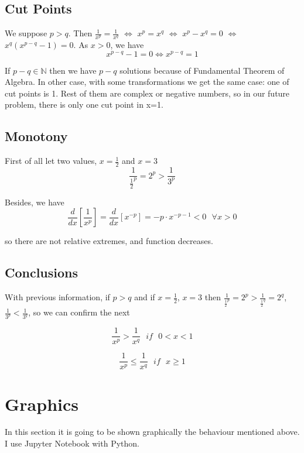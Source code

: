 \documentclass{article}
\begin{document}
\subsection{Cut Points}

We suppose \(p > q\). Then \(\frac{1}{{x^p}}=\frac{1}{x^q}\) \(\Leftrightarrow\) \({x^p}={x^q}\) \(\Leftrightarrow\) \({x^p}-{x^q}=0\) \(\Leftrightarrow\) \({x^q}({x^{p-q}}-1)=0\). As \(x>0\), we have 
\[
{x^{p-q}}-1=0 \Leftrightarrow {x^{p-q}}=1
\]

If \({p-q} \in \mathbb{N}\) then we have \(p-q\) solutions because of Fundamental Theorem of Algebra. In other case, with some transformations we get the same case: one of cut points is 1. Rest of them are complex or negative numbers, so in our future problem, there is only one cut point in x=1.

\subsection{Monotony}

First of all let two values, \(x=\frac{1}{2}\) and \(x=3\)
\[
	\frac{1}{\frac{1}{2}^p}={2^p} > \frac{1}{3^p}
\]

Besides, we have
\[
	\frac{d}{dx}\left[ \frac{1}{{x^p}} \right] = \frac{d}{dx}\left[x^{-p} \right] = -p \cdot x^{-p-1} < 0 \textbf{ } \forall x>0
\]

so there are not relative extremes, and function decreases.

\subsection{Conclusions}

With previous information, if \(p>q\) and if \(x=\frac{1}{2}\), \(x=3\) then \(\frac{1}{\frac{1}{2}^p}={2^p} > \frac{1}{\frac{1}{2}^q}={2^q}\), \(\frac{1}{3^p} < \frac{1}{3^q}\), so we can confirm the next

\[
	\frac{1}{{x^p}} > \frac{1}{{x^q}} \textbf{ } if \textbf{ } 0<x<1
\]

\[
	\frac{1}{{x^p}} \leq \frac{1}{{x^q}} \textbf{ } if \textbf{ } x \geq 1
\]

\section{Graphics}

In this section it is going to be shown graphically the behaviour mentioned above. I use Jupyter Notebook with Python.
\end{document}
